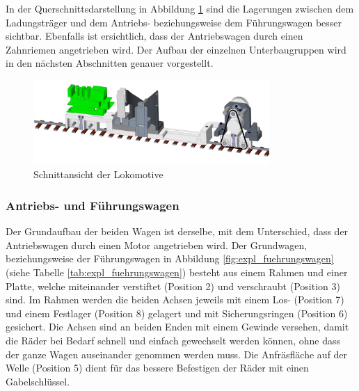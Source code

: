 \documentclass[../../main.tex]{subfiles}
\begin{document}
    In der Querschnittsdarstellung in Abbildung \ref{fig:schnitt_lokomotive} sind die Lagerungen zwischen dem Ladungsträger und dem Antriebs- beziehungsweise dem Führungswagen besser sichtbar. Ebenfalls ist ersichtlich, dass der Antriebswagen durch einen Zahnriemen angetrieben wird. Der Aufbau der einzelnen Unterbaugruppen wird in den nächsten Abschnitten genauer vorgestellt.\\

    \begin{figure}[H] %
        \centering
        \includegraphics[width=0.80\textwidth]{lokomotive_2.png}
        \caption{Schnittansicht der Lokomotive}
        \label{fig:schnitt_lokomotive}
    \end{figure}
    \newpage

    \subsubsection{Antriebs- und Führungswagen}
    Der Grundaufbau der beiden Wagen ist derselbe, mit dem Unterschied, dass der Antriebswagen durch einen Motor angetrieben wird. Der Grundwagen, beziehungsweise der Führungswagen in Abbildung \ref{fig:expl_fuehrungswagen} (siehe Tabelle \ref{tab:expl_fuehrungswagen}) besteht aus einem Rahmen und einer Platte, welche miteinander verstiftet (Position 2) und verschraubt (Position 3) sind. Im Rahmen werden die beiden Achsen jeweils mit einem Los- (Position 7) und einem Festlager (Position 8) gelagert und mit Sicherungsringen (Position 6) gesichert. Die Achsen sind an beiden Enden mit einem Gewinde versehen, damit die Räder bei Bedarf schnell und einfach gewechselt werden können, ohne dass der ganze Wagen auseinander genommen werden muss. Die Anfräsfläche auf der Welle (Position 5) dient für das bessere Befestigen der Räder mit einen Gabelschlüssel.\\
\end{document}

